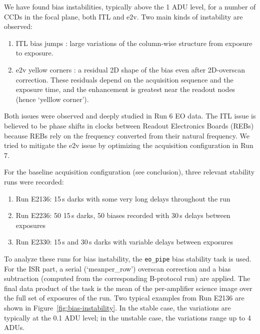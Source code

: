 We have found bias instabilities, typically above the 1 ADU level, for a number of CCDs in the focal plane, both ITL and e2v. Two main kinds of instability are observed:

\begin{enumerate}
\tightlist
\item
  ITL bias jumps : large variations of the column-wise structure from
  exposure to exposure.
\item
  e2v yellow corners : a residual 2D shape of the bias even after
  2D-overscan correction. These residuals depend on the acquisition
  sequence and the exposure time, and the enhancement is greatest near the readout nodes (hence `yelllow corner').
\end{enumerate}

Both issues were observed and deeply studied in Run 6 EO data. The ITL
issue is believed to be phase shifts in clocks between Readout
Electronics Boards (REBs) because REBs rely on the frequency converted
from their natural frequency. We tried to mitigate the e2v issue by
optimizing the acquisition configuration in Run 7.

For the baseline acquisition configuration (see conclusion), three
relevant stability runs were recorded:

\begin{enumerate}
\tightlist
\item
  Run E2136: 15\,s darks with some very long delays throughout the run
\item
  Run E2236: 50 15\,s darks, 50 biases recorded with 30\,s delays between
  exposures
\item
  Run E2330: 15\,s and 30\,s darks with variable delays between exposures
\end{enumerate}

To analyze these runs for bias instability, the {\tt eo\_pipe} bias
stability task is used.  For the ISR part, a serial
(`meanper\_row')
overscan correction and a bias subtraction (computed from the
corresponding B-protocol run) are applied. The final data product of the task is the
mean of the per-amplifier science image over the full set of exposures
of the run. Two typical examples from Run E2136 are shown in Figure~\ref{fig:bias-instability}. In the stable case, the variations are typically at the 0.1 ADU
level; in the unstable case, the variations range up to 4 ADUs.

